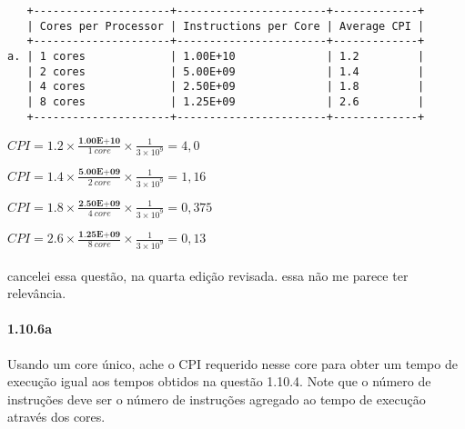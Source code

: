 \documentclass{article}
\begin{document}
\begin{verbatim}
   +---------------------+-----------------------+-------------+
   | Cores per Processor | Instructions per Core | Average CPI |
   +---------------------+-----------------------+-------------+
a. | 1 cores             | 1.00E+10              | 1.2         |
   | 2 cores             | 5.00E+09              | 1.4         |
   | 4 cores             | 2.50E+09              | 1.8         |
   | 8 cores             | 1.25E+09              | 2.6         |
   +---------------------+-----------------------+-------------+
\end{verbatim}

$CPI = 1.2 \times \frac{\textbf{1.00E+10}}{1\ core} \times \frac{1}{3 \times 
10^{9}} = 4,0$

$CPI = 1.4 \times \frac{\textbf{5.00E+09}}{2\ core} \times \frac{1}{3 \times 
10^{9}} = 1,16$

$CPI = 1.8 \times \frac{\textbf{2.50E+09}}{4\ core} \times \frac{1}{3 \times 
10^{9}} = 0,375$

$CPI = 2.6 \times \frac{\textbf{1.25E+09}}{8\ core} \times \frac{1}{3 \times 
10^{9}} = 0,13$

\paragraph{} cancelei essa questão, na quarta edição 
revisada. essa não me parece ter relevância.

\paragraph{1.10.6a} Usando um core único, ache o CPI requerido nesse core para 
obter um tempo de execução igual aos tempos obtidos na questão 1.10.4. Note que 
o número de instruções deve ser o número de instruções agregado ao tempo de 
execução através dos cores.
\end{document}
